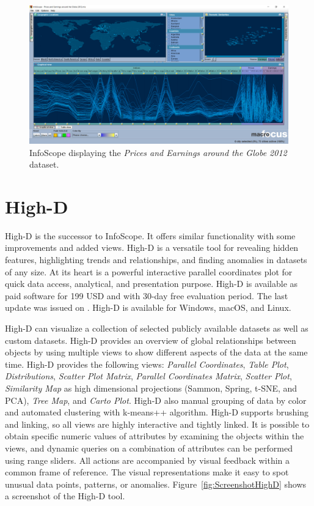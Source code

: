 \begin{figure}[tp]
\centering
\includegraphics[keepaspectratio,width=\linewidth,height=\halfh]
{images/screenshot-infoscope.png}

\caption[InfoScope]
{%
InfoScope displaying the \emph{Prices and Earnings around the Globe 2012} dataset.
}
\label{fig:ScreenshotInfoScope}
\end{figure}




\section{High-D}

High-D \parencite{HighD} is the successor to InfoScope. It offers similar
functionality with some improvements and added views. High-D is a
versatile tool for revealing hidden features, highlighting trends and
relationships, and finding anomalies in datasets of any size. At its heart
is a powerful interactive parallel coordinates plot for quick data access,
analytical, and presentation purpose. High-D is available as paid software
for 199 USD and with 30-day free evaluation period. The last update was
issued on . High-D is available for Windows,
macOS, and Linux.


High-D can visualize a collection of selected publicly available datasets
as well as custom datasets. High-D provides an overview of global
relationships between objects by using multiple views to show different
aspects of the data at the same time. High-D provides the following views:
\emph{Parallel Coordinates}, \emph{Table Plot}, \emph{Distributions},
\emph{Scatter Plot Matrix}, \emph{Parallel Coordinates Matrix},
\emph{Scatter Plot}, \emph{Similarity Map} as high dimensional projections
(Sammon, Spring, t-SNE, and PCA), \emph{Tree Map}, and \emph{Carto Plot}.
High-D also manual grouping of data by color and automated clustering with
k-means++ algorithm. High-D supports brushing and linking, so all views
are highly interactive and tightly linked. It is possible to obtain
specific numeric values of attributes by examining the objects within the
views, and dynamic queries on a combination of attributes can be performed
using range sliders. All actions are accompanied by visual feedback within
a common frame of reference. The visual representations make it easy to
spot unusual data points, patterns, or anomalies.
Figure~\ref{fig:ScreenshotHighD} shows a screenshot of the High-D tool.




